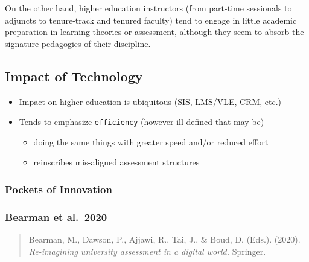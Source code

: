\documentclass[
]{book}
\providecommand{\tightlist}{%
  \setlength{\itemsep}{0pt}\setlength{\parskip}{0pt}}
\begin{document}
On the other hand, higher education instructors (from part-time sessionals to adjuncts to tenure-track and tenured faculty) tend to engage in little academic preparation in learning theories or assessment, although they seem to absorb the signature pedagogies of their discipline.

\hypertarget{impact-of-technology}{%
\subsection*{Impact of Technology}\label{impact-of-technology}}

\begin{itemize}
\tightlist
\item
  Impact on higher education is ubiquitous (SIS, LMS/VLE, CRM, etc.)
\item
  Tends to emphasize \texttt{efficiency} (however ill-defined that may be)

  \begin{itemize}
  \tightlist
  \item
    doing the same things with greater speed and/or reduced effort
  \item
    reinscribes mis-aligned assessment structures
  \end{itemize}
\end{itemize}

\hypertarget{pockets-of-innovation}{%
\subsubsection*{Pockets of Innovation}\label{pockets-of-innovation}}

\hypertarget{bearman-et-al.-2020}{%
\subsubsection*{Bearman et al.~2020}\label{bearman-et-al.-2020}}

\begin{quote}
Bearman, M., Dawson, P., Ajjawi, R., Tai, J., \& Boud, D. (Eds.). (2020). \emph{Re-imagining university assessment in a digital world.} Springer.
\end{quote}
\end{document}
